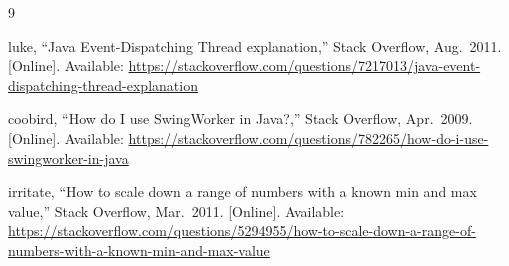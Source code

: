 \documentclass[conference,compsoc]{IEEEtran}
\begin{document}

\begin{thebibliography}{9}

luke, ``Java Event-Dispatching Thread explanation,''
Stack Overflow, Aug.\ 2011. [Online]. Available:
\url{https://stackoverflow.com/questions/7217013/java-event-dispatching-thread-explanation}

coobird, ``How do I use SwingWorker in Java?,''
Stack Overflow, Apr.\ 2009. [Online]. Available:
\url{https://stackoverflow.com/questions/782265/how-do-i-use-swingworker-in-java}

irritate, ``How to scale down a range of numbers with a known min and max value,''
Stack Overflow, Mar.\ 2011. [Online]. Available:
\url{https://stackoverflow.com/questions/5294955/how-to-scale-down-a-range-of-numbers-with-a-known-min-and-max-value}

\end{thebibliography}
\end{document}
